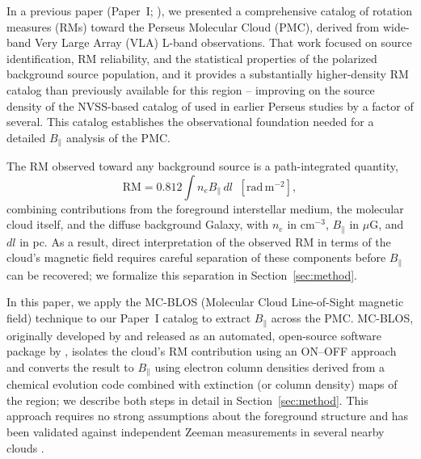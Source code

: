 \documentclass[twocolumn]{aastex631}
\begin{document}
In a previous paper (Paper~I; \citealt{hajizadeh2026comprehensive}), we presented a comprehensive catalog of rotation measures (RMs) toward the Perseus Molecular Cloud (PMC), derived from wide-band Very Large Array (VLA) L-band observations. That work focused on source identification, RM reliability, and the statistical properties of the polarized background source population, and it provides a substantially higher-density RM catalog than previously available for this region -- improving on the source density of the NVSS-based catalog of \citet{taylor2009} used in earlier Perseus studies by a factor of several. This catalog establishes the observational foundation needed for a detailed $B_\parallel$ analysis of the PMC.

The RM observed toward any background source is a path-integrated quantity,
\begin{equation}
\label{eq:rm-basic}
    \mathrm{RM} = 0.812 \int n_e B_\parallel \, dl \;\;[\mathrm{rad\,m^{-2}}],
\end{equation}
combining contributions from the foreground interstellar medium, the molecular cloud itself, and the diffuse background Galaxy, with $n_e$ in $\mathrm{cm^{-3}}$, $B_\parallel$ in $\mu$G, and $dl$ in pc. As a result, direct interpretation of the observed RM in terms of the cloud's magnetic field requires careful separation of these components before $B_\parallel$ can be recovered; we formalize this separation in Section~\ref{sec:method}.

In this paper, we apply the MC-BLOS (Molecular Cloud Line-of-Sight magnetic field) technique to our Paper~I catalog to extract $B_\parallel$ across the PMC. MC-BLOS, originally developed by \citet{tahani2018} and released as an automated, open-source software package by \citet{tahani2025mcblos}, isolates the cloud's RM contribution using an ON--OFF approach and converts the result to $B_\parallel$ using electron column densities derived from a chemical evolution code combined with extinction (or column density) maps of the region; we describe both steps in detail in Section~\ref{sec:method}. This approach requires no strong assumptions about the foreground structure and has been validated against independent Zeeman measurements in several nearby clouds \citep{tahani2018, tahani2025mcblos}.
\end{document}
